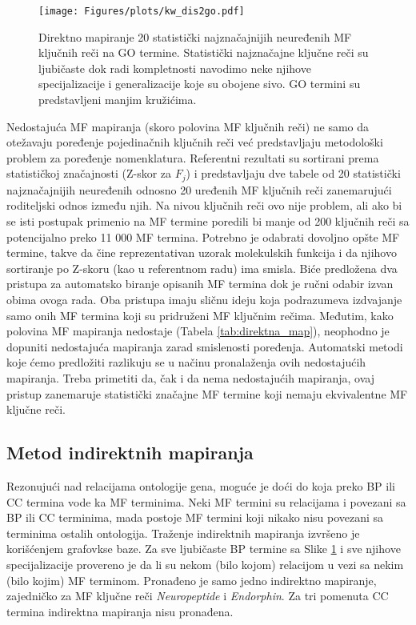 \begin{figure}[!th]
\hspace*{-2.2cm} 
\texttt{[image: Figures/plots/kw\_dis2go.pdf]}
\decoRule
\caption {
  Direktno mapiranje 20 statistički najznačajnijih neuređenih MF ključnih reči
  \parencite{Xie2007} na GO termine.  Statistički najznačajne ključne reči su
  ljubičaste dok radi kompletnosti navodimo neke njihove specijalizacije i
  generalizacije koje su obojene sivo. GO termini su predstavljeni manjim
  kružićima.
}
\label{fig:KWtop20dis}
\end{figure}

Nedostajuća MF mapiranja (skoro polovina MF ključnih reči) ne samo da otežavaju
poređenje pojedinačnih ključnih reči već predstavljaju metodološki problem za
poređenje nomenklatura.  Referentni rezultati su sortirani prema statističkoj
značajnosti (Z-skor za $F_j$) i predstavljaju dve tabele od 20 statistički
najznačajnijih neuređenih odnosno 20 uređenih MF ključnih reči zanemarujući
roditeljski odnos između njih. Na nivou ključnih reči ovo nije problem, ali ako
bi se isti postupak primenio na MF termine poredili bi manje od 200 ključnih
reči sa potencijalno preko 11 000 MF termina. Potrebno je odabrati dovoljno
opšte MF termine, takve da čine reprezentativan uzorak molekulskih funkcija i
da njihovo sortiranje po Z-skoru (kao u referentnom radu) ima smisla.  Biće
predložena dva pristupa za automatsko biranje opisanih MF termina dok je ručni
odabir izvan obima ovoga rada.  Oba pristupa imaju sličnu ideju koja podrazumeva izdvajanje samo 
onih MF termina koji su pridruženi MF ključnim rečima. Međutim, kako polovina MF
mapiranja nedostaje (Tabela \ref{tab:direktna_map}), neophodno je dopuniti
nedostajuća mapiranja zarad smislenosti poređenja.  Automatski metodi koje ćemo
predložiti razlikuju se u načinu pronalaženja ovih nedostajućih mapiranja.
Treba primetiti da, čak i da nema nedostajućih mapiranja, ovaj pristup
zanemaruje statistički značajne MF termine koji nemaju ekvivalentne MF ključne
reči. 



\clearpage

\subsection{Metod indirektnih mapiranja}

Rezonujući nad relacijama ontologije gena, moguće je doći do
 koja preko BP ili CC termina vode ka MF
terminima. Neki MF termini su relacijama  i
 povezani sa BP ili CC terminima, mada postoje MF termini
koji nikako nisu povezani sa terminima ostalih  ontologija. Traženje
indirektnih mapiranja izvršeno je korišćenjem  grafovkse baze.
Za sve ljubičaste BP termine sa Slike \ref{fig:KWtop20dis} i sve njihove
specijalizacije provereno je da li su nekom (bilo kojom) relacijom u vezi sa
nekim (bilo kojim) MF terminom. Pronađeno je samo jedno indirektno mapiranje,
zajedničko za MF ključne reči \textit{Neuropeptide} i \textit{Endorphin}. Za
tri pomenuta CC termina indirektna mapiranja nisu pronađena. 


